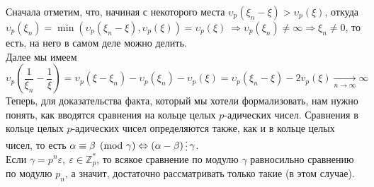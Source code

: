 \documentclass[11pt]{article}
\begin{document}
    Сначала отметим, что, начиная с некоторого места $ \upsilon_p{(\xi_n - \xi)} > \upsilon_p{(\xi)}$, откуда $ \upsilon_p{(\xi_n)} = \min( \upsilon_p{(\xi_n - \xi)}, \upsilon_p{(\xi)}) = \upsilon_p{(\xi)} \ \Rightarrow \upsilon_p{(\xi_n)} \neq \infty \Rightarrow \xi_n \neq 0$,
    то есть, на него в самом деле можно делить. \\

    Далее мы имеем
    \[ \upsilon_p{\left(\frac{1}{\xi_n} - \frac{1}{\xi} \right)} = \upsilon_p{(\xi - \xi_n)} - \upsilon_p{(\xi_n)} - \upsilon_p{(\xi)} = \upsilon_p{(\xi_n - \xi)} - 2v_p(\xi) \xrightarrow[n \to \infty]{} \infty \]
    Теперь, для доказательства факта, который мы хотели формализовать, нам нужно понять, как вводятся сравнения на кольце целых $p$-адических чисел.
    Сравнения в кольце целых $p$-адических чисел определяются также, как и в кольце целых чисел, то есть $\alpha \equiv \beta \pmod{\gamma} \Leftrightarrow (\alpha - \beta) \divisible \gamma$.\\

    Если $\gamma = p^n \varepsilon, \ \varepsilon \in \mathbb{Z}_p^{*}$, то всякое сравнение по модулю $\gamma$ равносильно сравнению по модулю $p_n$, а значит,
    достаточно рассматривать только такие (в этом случае).
\end{document}
